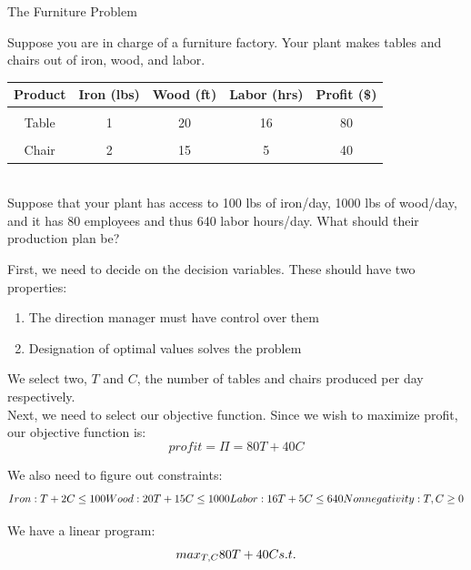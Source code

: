 \documentclass{article}
\begin{document}
\begin{eg}{The Furniture Problem}
    
    Suppose you are in charge of a furniture factory. Your plant makes tables
    and chairs out of iron, wood, and labor. \\
    \begin{tabular}
    { |c | c | c | c | c | }
     \hline
     Product & Iron (lbs) & Wood (ft) & Labor (hrs) & Profit (\$) \\
     \hline \\
        Table & 1 & 20 & 16 & 80 \\
     \hline \\
        Chair & 2 & 15 & 5 & 40 \\
     \hline
    \end{tabular} \\
    
    Suppose that your plant has access to 100 lbs of iron/day, 1000 lbs of 
    wood/day, and it has 80 employees and thus 640 labor hours/day. What should
    their production plan be?
\end{eg}

\begin{answer}
    First, we need to decide on the decision variables. These should have two properties:
    \begin{enumerate}
        \item The direction manager must have control over them
        \item Designation of optimal values solves the problem
    \end{enumerate}
    We select two, \(T\) and \(C\), the number of tables and chairs produced per day respectively. \\

    Next, we need to select our objective function. Since we wish to maximize
    profit, our objective function is:
    \[
        profit=\Pi =80T+40C
    \]

    We also need to figure out constraints:
    \[
        Iron: T+2C\leq100
        \\Wood: 20T+15C\leq1000 \\
        \\Labor: 16T+5C\leq640 
        \\Nonnegativity: T,C\geq0
    \]
    
    We have a linear program:
    \[
        max_{T,C} 80T+40C \\
        s.t. 
    \]

\end{answer}
\end{document}
